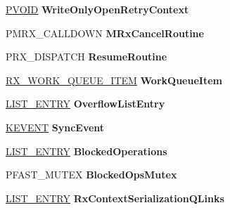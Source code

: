 \begin{DoxyCompactItemize}
\begin{tabbing}
\end{tabbing}\item 
\mbox{\label{struct___r_x___c_o_n_t_e_x_t_a0652e54ab6ef68c1cba68d6df79f484c}} 
\hyperlink{interfacevoid}{P\+V\+O\+ID} {\bfseries Write\+Only\+Open\+Retry\+Context}
\item 
\mbox{\label{struct___r_x___c_o_n_t_e_x_t_a53eb53826c893bf3dee0db16c65a181d}} 
P\+M\+R\+X\+\_\+\+C\+A\+L\+L\+D\+O\+WN {\bfseries M\+Rx\+Cancel\+Routine}
\item 
\mbox{\label{struct___r_x___c_o_n_t_e_x_t_a6ed7745acebd5f3078c06654ccbd51d3}} 
P\+R\+X\+\_\+\+D\+I\+S\+P\+A\+T\+CH {\bfseries Resume\+Routine}
\item 
\mbox{\label{struct___r_x___c_o_n_t_e_x_t_a01ce3a18787fe52eb0dd9668f4d415d3}} 
\hyperlink{struct___r_x___w_o_r_k___q_u_e_u_e___i_t_e_m__}{R\+X\+\_\+\+W\+O\+R\+K\+\_\+\+Q\+U\+E\+U\+E\+\_\+\+I\+T\+EM} {\bfseries Work\+Queue\+Item}
\item 
\mbox{\label{struct___r_x___c_o_n_t_e_x_t_a182666d68751a84a532717f21e403e43}} 
\hyperlink{struct___l_i_s_t___e_n_t_r_y}{L\+I\+S\+T\+\_\+\+E\+N\+T\+RY} {\bfseries Overflow\+List\+Entry}
\item 
\mbox{\label{struct___r_x___c_o_n_t_e_x_t_a321299f30dc069975cfcf01a704ab700}} 
\hyperlink{struct___k_e_v_e_n_t}{K\+E\+V\+E\+NT} {\bfseries Sync\+Event}
\item 
\mbox{\label{struct___r_x___c_o_n_t_e_x_t_ac68f1c751a71538d1825dc31563565f5}} 
\hyperlink{struct___l_i_s_t___e_n_t_r_y}{L\+I\+S\+T\+\_\+\+E\+N\+T\+RY} {\bfseries Blocked\+Operations}
\item 
\mbox{\label{struct___r_x___c_o_n_t_e_x_t_aec70fd600017bc446b2e553c8b271978}} 
P\+F\+A\+S\+T\+\_\+\+M\+U\+T\+EX {\bfseries Blocked\+Ops\+Mutex}
\item 
\mbox{\label{struct___r_x___c_o_n_t_e_x_t_ae5b7de5f5d6cdafee0bc2ea9f173636d}} 
\hyperlink{struct___l_i_s_t___e_n_t_r_y}{L\+I\+S\+T\+\_\+\+E\+N\+T\+RY} {\bfseries Rx\+Context\+Serialization\+Q\+Links}

\end{DoxyCompactItemize}
